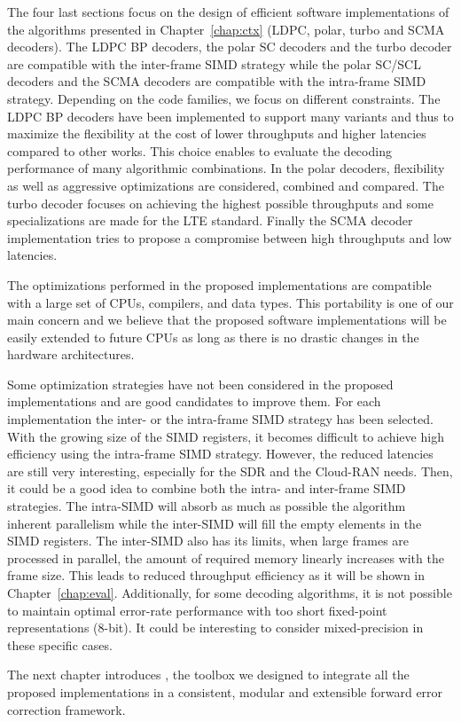 The four last sections focus on the design of efficient software implementations
of the algorithms presented in Chapter~\ref{chap:ctx} (LDPC, polar, turbo and
SCMA decoders). The LDPC BP decoders, the polar SC decoders and the turbo
decoder are compatible with the inter-frame SIMD strategy while the polar SC/SCL
decoders and the SCMA decoders are compatible with the intra-frame SIMD
strategy. Depending on the code families, we focus on different constraints. The
LDPC BP decoders have been implemented to support many variants and thus to
maximize the flexibility at the cost of lower throughputs and higher latencies
compared to other works. This choice enables to evaluate the decoding
performance of many algorithmic combinations. In the polar decoders, flexibility
as well as aggressive optimizations are considered, combined and compared. The
turbo decoder focuses on achieving the highest possible throughputs and some
specializations are made for the LTE standard. Finally the SCMA decoder
implementation tries to propose a compromise between high throughputs and low
latencies.

The optimizations performed in the proposed implementations are compatible with
a large set of CPUs, compilers, and data types. This portability is one of our
main concern and we believe that the proposed software implementations will be
easily extended to future CPUs as long as there is no drastic changes in the
hardware architectures.

Some optimization strategies have not been considered in the proposed
implementations and are good candidates to improve them. For each implementation
the inter- or the intra-frame SIMD strategy has been selected. With the growing
size of the SIMD registers, it becomes difficult to achieve high efficiency
using the intra-frame SIMD strategy. However, the reduced latencies are still
very interesting, especially for the SDR and the Cloud-RAN needs. Then, it could
be a good idea to combine both the intra- and inter-frame SIMD strategies. The
intra-SIMD will absorb as much as possible the algorithm inherent parallelism
while the inter-SIMD will fill the empty elements in the SIMD registers. The
inter-SIMD also has its limits, when large frames are processed in parallel, the
amount of required memory linearly increases with the frame size. This leads to
reduced throughput efficiency as it will be shown in Chapter~\ref{chap:eval}.
Additionally, for some decoding algorithms, it is not possible to maintain
optimal error-rate performance with too short fixed-point representations
(8-bit). It could be interesting to consider mixed-precision in these specific
cases.


The next chapter introduces \AFFECT, the toolbox we designed to integrate all
the proposed implementations in a consistent, modular and extensible forward
error correction framework.
